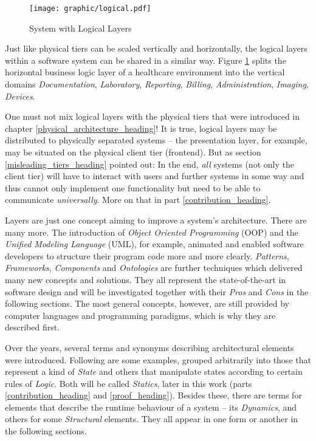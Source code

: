 \begin{figure}[ht]
    \begin{center}
        \texttt{[image: graphic/logical.pdf]}
        \caption{System with Logical Layers}
        \label{logical_figure}
    \end{center}
\end{figure}

Just like physical tiers can be scaled vertically and horizontally, the logical
layers within a software system can be shared in a similar way. Figure
\ref{logical_figure} splits the horizontal business logic layer of a healthcare
environment into the vertical domains \emph{Documentation}, \emph{Laboratory},
\emph{Reporting}, \emph{Billing}, \emph{Administration}, \emph{Imaging},
\emph{Devices}.

One must not mix logical layers with the physical tiers that were introduced in
chapter \ref{physical_architecture_heading}! It is true, logical layers may be
distributed to physically separated systems -- the presentation layer, for
example, may be situated on the physical client tier (frontend). But as section
\ref{misleading_tiers_heading} pointed out: In the end, \emph{all}
systems (not only the client tier) will have to interact with users and further
systems in some way and thus cannot only implement one functionality but need
to be able to communicate \emph{universally}. More on that in part
\ref{contribution_heading}.

Layers are just one concept aiming to improve a system's architecture. There
are many more. The introduction of \emph{Object Oriented Programming} (OOP) and
the \emph{Unified Modeling Language} (UML), for example, animated and enabled
software developers to structure their program code more and more clearly.
\emph{Patterns}, \emph{Frameworks}, \emph{Components} and \emph{Ontologies} are
further techniques which delivered many new concepts and solutions. They all
represent the state-of-the-art in software design and will be investigated
together with their \emph{Pros} and \emph{Cons} in the following sections. The
most general concepts, however, are still provided by computer languages and
programming paradigms, which is why they are described first.

Over the years, several terms and synonyms describing architectural elements
were introduced. Following are some examples, grouped arbitrarily into those
that represent a kind of \emph{State} and others that manipulate states
according to certain rules of \emph{Logic}. Both will be called \emph{Statics},
later in this work (parts \ref{contribution_heading} and \ref{proof_heading}).
Besides these, there are terms for elements that describe the runtime behaviour
of a system -- its \emph{Dynamics}, and others for some \emph{Structural}
elements. They all appear in one form or another in the following sections.

